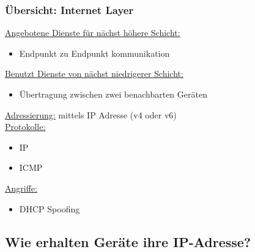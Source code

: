 \subsubsection*{Übersicht: Internet Layer}
\underline{Angebotene Dienste für nächst höhere Schicht:}
\begin{itemize}
    \item Endpunkt zu Endpunkt kommunikation
\end{itemize}
\underline{Benutzt Dienste von nächst niedrigerer Schicht:}
\begin{itemize}
    \item Übertragung zwischen zwei benachbarten Geräten
\end{itemize}
\underline{Adressierung:} mittels IP Adresse (v4 oder v6)\\
\underline{Protokolle:}
\begin{itemize}
    \item IP
    \item ICMP
\end{itemize}
\underline{Angriffe:}
\begin{itemize}
    \item DHCP Spoofing
\end{itemize}
\subsection{Wie erhalten Geräte ihre IP-Adresse?}

